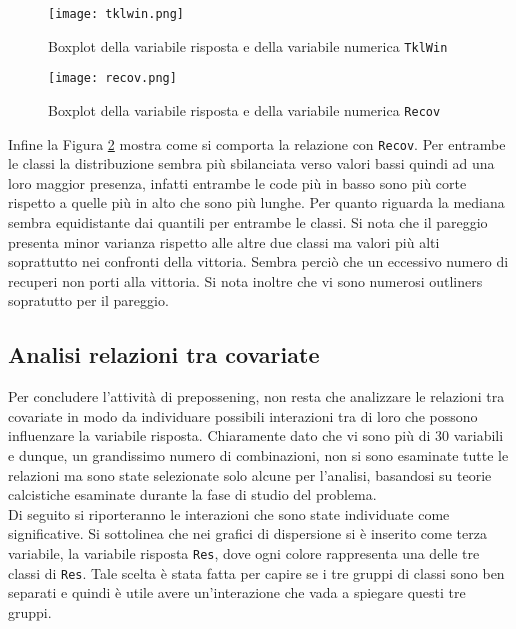 \begin{figure}[htbp]
	\begin{center}
		\texttt{[image: tklwin.png]}
		\caption{Boxplot della variabile risposta e della variabile numerica \texttt{TklWin}} \label{fig:tkl}
	\end{center}
\end{figure}

\begin{figure}[htbp]
	\begin{center}
		\texttt{[image: recov.png]}
		\caption{Boxplot della variabile risposta e della variabile numerica \texttt{Recov}} \label{fig:recov}
	\end{center}
\end{figure} 

Infine la Figura \ref{fig:recov} mostra come si comporta la relazione con \texttt{Recov}. Per entrambe le classi la distribuzione sembra più sbilanciata verso valori bassi quindi ad una loro maggior presenza, infatti entrambe le code più in basso sono più corte rispetto a quelle più in alto che sono più lunghe. Per quanto riguarda la mediana sembra equidistante dai quantili per entrambe le classi. Si nota che il pareggio presenta minor varianza rispetto alle altre due classi ma valori più alti soprattutto nei confronti della vittoria. Sembra perciò che un eccessivo numero di recuperi non porti alla vittoria. Si nota inoltre che vi sono numerosi outliners sopratutto per il pareggio.

\subsection{Analisi relazioni tra covariate} 
Per concludere l'attività di prepossening, non resta che analizzare le relazioni tra covariate in modo da individuare possibili interazioni tra di loro che possono influenzare la variabile risposta. Chiaramente dato che vi sono più di 30 variabili e dunque, un grandissimo numero di combinazioni, non si sono esaminate tutte le relazioni ma sono state selezionate solo alcune per l'analisi, basandosi su teorie calcistiche esaminate durante la fase di studio del problema.\\
Di seguito si riporteranno le interazioni che sono state individuate come significative. Si sottolinea che nei grafici di dispersione si è inserito come terza variabile, la variabile risposta \texttt{Res}, dove ogni colore rappresenta una delle tre classi di \texttt{Res}. Tale scelta è stata fatta per capire se i tre gruppi di classi sono ben separati e quindi è utile avere un'interazione che vada a spiegare questi tre gruppi.\\


